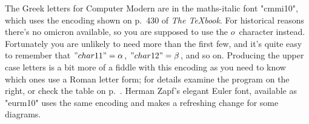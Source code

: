 \documentclass[a4paper,landscape]{article}
\begin{document}
The Greek letters for Computer Modern are in the maths-italic font "cmmi10", which
uses the encoding shown on p.\ 430 of \textsl{The \TeX{}book}.  For historical
reasons there's no omicron available, so you are supposed to use the $o$~character
instead.  Fortunately you are unlikely to need more than the first few, and it's
quite easy to remember that $"char 11"=\alpha$, $"char 12"=\beta$, and so on.
Producing the upper case letters is a bit more of a fiddle with this encoding as you
need to know which ones use a Roman letter form; for details examine the program on
the right, or check the table on p.~\pageref{eulertable}.
Herman Zapf's elegant Euler font, available as "eurm10" uses the same encoding and
makes a refreshing change for some diagrams.
\end{document}
